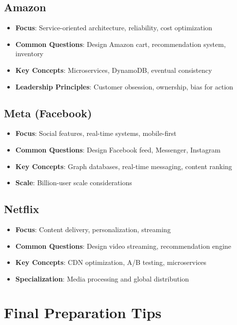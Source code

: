 \documentclass[10pt,a4paper]{article}
\begin{document}
\subsection{Amazon}
\begin{itemize}
\item \textbf{Focus}: Service-oriented architecture, reliability, cost optimization
\item \textbf{Common Questions}: Design Amazon cart, recommendation system, inventory
\item \textbf{Key Concepts}: Microservices, DynamoDB, eventual consistency
\item \textbf{Leadership Principles}: Customer obsession, ownership, bias for action
\end{itemize}

\subsection{Meta (Facebook)}
\begin{itemize}
\item \textbf{Focus}: Social features, real-time systems, mobile-first
\item \textbf{Common Questions}: Design Facebook feed, Messenger, Instagram
\item \textbf{Key Concepts}: Graph databases, real-time messaging, content ranking
\item \textbf{Scale}: Billion-user scale considerations
\end{itemize}

\subsection{Netflix}
\begin{itemize}
\item \textbf{Focus}: Content delivery, personalization, streaming
\item \textbf{Common Questions}: Design video streaming, recommendation engine
\item \textbf{Key Concepts}: CDN optimization, A/B testing, microservices
\item \textbf{Specialization}: Media processing and global distribution
\end{itemize}

\section{Final Preparation Tips}
\end{document}
